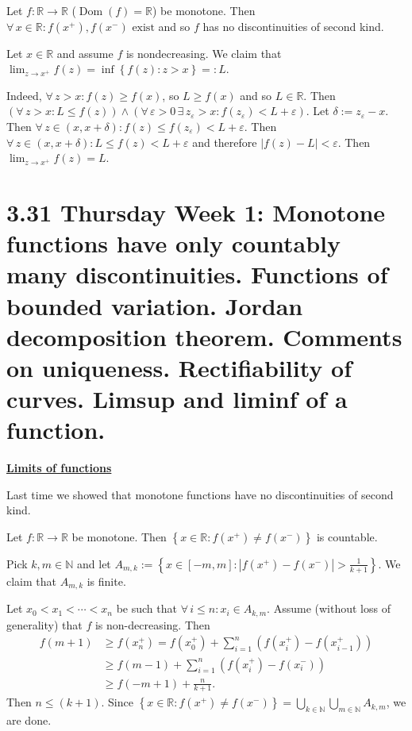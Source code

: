 \documentclass{notes}
\begin{document}
  \begin{lem}
    Let $f \colon \mathbb R \to \mathbb R$ ($\operatorname{Dom}(f) = \mathbb R$) be monotone.
    Then $\forall \, x \in \mathbb R: \text{$f(x^+), f(x^-)$ exist}$ and so $f$ has no discontinuities of second kind.
  \end{lem}
  
  \begin{prf}
    Let $x \in \mathbb R$ and assume $f$ is nondecreasing.
    We claim that $\lim_{z \to x^+} f(z) = \inf \left \{ f(z) : z > x \right \}=: L$.

    Indeed, $\forall \, z > x: f(z) \geq f(x)$, so $L \geq f(x)$ and so $L \in \mathbb R$.
    Then $(\forall \, z > x: L \leq f(z)) \land (\forall \, \varepsilon > 0 \, \exists \, z_\varepsilon  > x: f(z_\varepsilon) < L + \varepsilon)$.
    Let $\delta := z_\varepsilon - x$.
    Then $\forall \, z \in (x, x + \delta): f(z) \leq f(z_\varepsilon) < L + \varepsilon$.
    Then $\forall \, z \in (x, x + \delta): L \leq f(z) < L + \varepsilon$ and therefore $\left | f(z) - L \right | < \varepsilon$.
    Then $\lim_{z \to x^+} f(z) = L$.
  \end{prf}
  
  \section{3.31 Thursday Week 1: Monotone functions have only countably many discontinuities. Functions of bounded variation. Jordan decomposition theorem. Comments on uniqueness. Rectifiability of curves. Limsup and liminf of a function.}
  
  \underline{\boldmath \bfseries Limits of functions}
  
  Last time we showed that monotone functions have no discontinuities of second kind.

  \begin{lem}
    Let $f \colon \mathbb R \to \mathbb R$ be monotone.
    Then $\left \{ x \in \mathbb R : f(x^+) \neq f(x^-) \right \}$ is countable.
  \end{lem}
  
  \begin{prf}
    Pick $k, m \in \mathbb N$ and let $A_{m, k} := \left \{ x \in [-m, m] : \left | f(x^+) - f(x^-) \right | > \frac{1}{k + 1} \right \}$.
    We claim that $A_{m, k}$ is finite.
    
    Let $x_{0} < x_{1} < \cdots < x_n$ be such that $\forall \, i \leq n: x_i \in A_{k, m}$.
    Assume (without loss of generality) that $f$ is non-decreasing.
    Then 
    \begin{align}
      f(m + 1) &\geq f(x_n^+) = f(x_0^+) + \sum_{i = 1}^n \left ( f(x_i^+) - f(x_{i - 1}^+) \right ) \nonumber \\ 
      &\geq f(m - 1) + \sum_{i = 1}^n \left ( f(x_i^+) - f(x_i^-) \right ) \nonumber \\ 
      &\geq f(-m + 1) + \frac{n}{k + 1}.
    \end{align}
    Then $n \leq (k + 1)$.
    Since $\left \{ x \in \mathbb R : f(x^+) \neq f(x^-) \right \} = \bigcup_{k \in \mathbb N} \bigcup_{m \in \mathbb N} A_{k, m}$, we are done.
  \end{prf}
  
\end{document}
